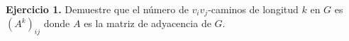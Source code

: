 \textbf{Ejercicio 1.} Demuestre que el número de $v_i v_j$-caminos de longitud $k$ en $G$
es $(A^k)_{ij}$ donde $A$ es la matriz de adyacencia de $G$.